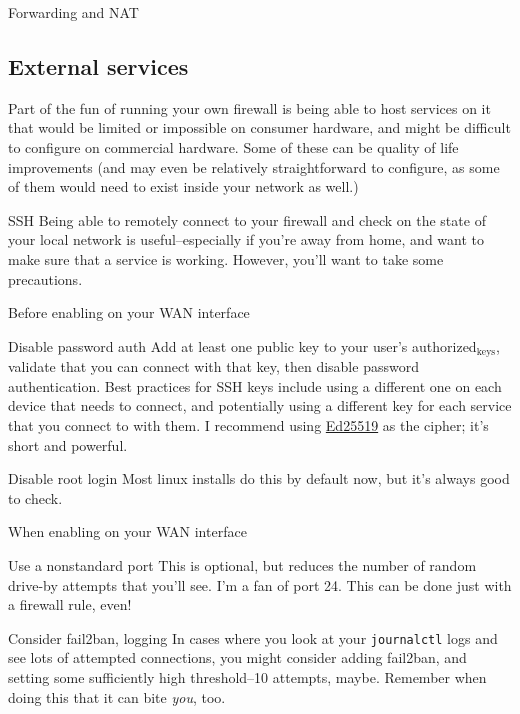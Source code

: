 \documentclass[bigger]{beamer}
\begin{document}
\begin{frame}[label={sec:org87a247f}]{Forwarding and NAT}
\end{frame}

\subsection{External services}
\label{sec:org55a4d52}

Part of the fun of running your own firewall is being able to host services on
it that would be limited or impossible on consumer hardware, and might be
difficult to configure on commercial hardware. Some of these can be quality of
life improvements (and may even be relatively straightforward to configure,
as some of them would need to exist inside your network as well.)

\begin{frame}[fragile,label={sec:org8635474}]{SSH}
 Being able to remotely connect to your firewall and check on the state of your
local network is useful--especially if you're away from home, and want to make
sure that a service is working. However, you'll want to take some precautions.

\begin{block}{Before enabling on your WAN interface}
\begin{block}{Disable password auth}
Add at least one public key to your user's authorized\(_{\text{keys}}\), validate that
you can connect with that key, then disable password authentication. Best
practices for SSH keys include using a different one on each device that
needs to connect, and potentially using a different key for each service
that you connect to with them. I recommend using \href{https://en.wikipedia.org/wiki/EdDSA\#Ed25519}{Ed25519} as the cipher;
it's short and powerful.
\end{block}
\begin{block}{Disable root login}
Most linux installs do this by default now, but it's always good to
check.
\end{block}
\end{block}

\begin{block}{When enabling on your WAN interface}
\begin{block}{Use a nonstandard port}
This is optional, but reduces the number of random drive-by attempts that
you'll see. I'm a fan of port 24. This can be done just with a firewall
rule, even!
\end{block}

\begin{block}{Consider fail2ban, logging}
In cases where you look at your \texttt{journalctl} logs and see lots of
attempted connections, you might consider adding fail2ban, and setting
some sufficiently high threshold--10 attempts, maybe. Remember when doing
this that it can bite \emph{you}, too.
\end{block}
\end{block}
\end{frame}
\end{document}

